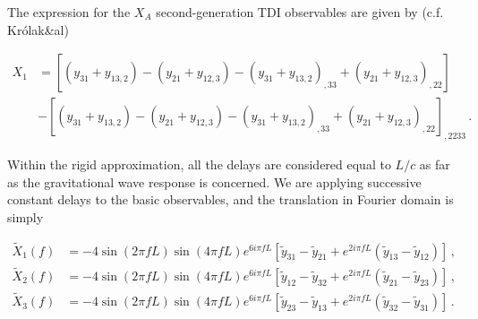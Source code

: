 \documentclass[aps,showpacs,%
prd,superscriptaddress,nofootinbib]{revtex4}
\newcommand{\nn}{\nonumber}
\begin{document}
The expression for the $X_{A}$ second-generation TDI observables are given by (c.f. Kr\'olak\&al)
%
\begin{widetext}
\begin{align}
	X_{1} &= \left[ \left( y_{31} + y_{13,2} \right) - \left( y_{21} + y_{12,3} \right) - \left( y_{31} + y_{13,2} \right)_{,33} + \left( y_{21} + y_{12,3} \right)_{,22} \right] \nn\\
	& - \left[ \left( y_{31} + y_{13,2} \right) - \left( y_{21} + y_{12,3} \right) - \left( y_{31} + y_{13,2} \right)_{,33} + \left( y_{21} + y_{12,3} \right)_{,22} \right]_{,2233} \,.
\end{align}
\end{widetext}
%
Within the rigid approximation, all the delays are considered equal to $L/c$ as far as the gravitational wave response is concerned. We are applying successive constant delays to the basic observables, and the translation in Fourier domain is simply
%
\begin{widetext}
\begin{align}
	\tilde{X}_{1}(f) &= -4 \sin\left( 2\pi f L \right) \sin\left( 4\pi f L \right) e^{6 i \pi f L} \left[ \tilde{y}_{31} - \tilde{y}_{21} + e^{2i\pi f L} \left( \tilde{y}_{13} - \tilde{y}_{12} \right) \right] \,, \nn\\
	\tilde{X}_{2}(f) &= -4 \sin\left( 2\pi f L \right) \sin\left( 4\pi f L \right) e^{6 i \pi f L} \left[ \tilde{y}_{12} - \tilde{y}_{32} + e^{2i\pi f L} \left( \tilde{y}_{21} - \tilde{y}_{23} \right) \right] \,, \nn\\
	\tilde{X}_{3}(f) &= -4 \sin\left( 2\pi f L \right) \sin\left( 4\pi f L \right) e^{6 i \pi f L}\left[ \tilde{y}_{23} - \tilde{y}_{13} + e^{2i\pi f L} \left( \tilde{y}_{32} - \tilde{y}_{31} \right) \right] \,.
\end{align}
\end{widetext}
%
\end{document}
